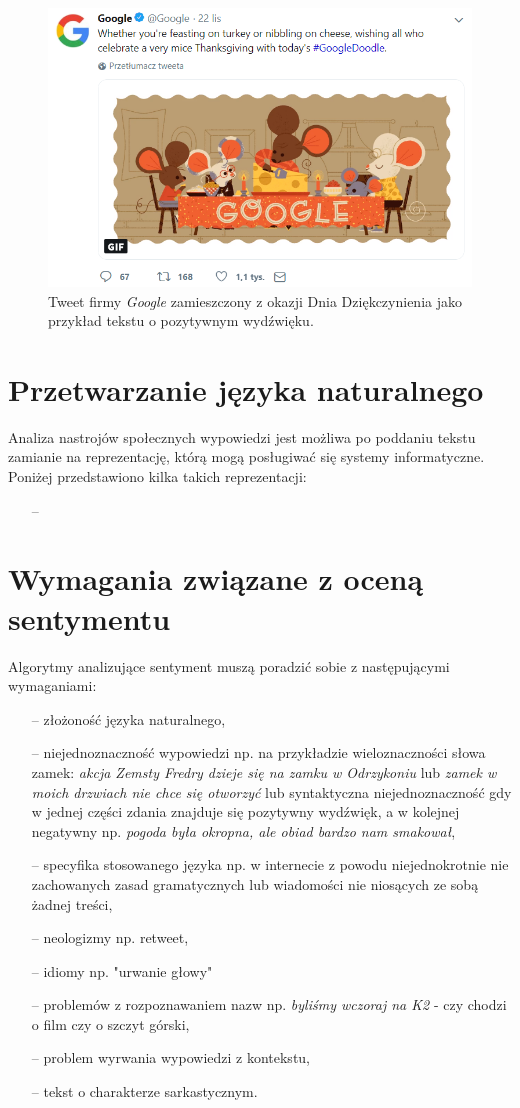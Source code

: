 \begin{figure}[h] %
	\centering
	\includegraphics[width=0.8\linewidth]{img/nlp_google_tweet}
	\caption{Tweet firmy \textit{Google} zamieszczony z okazji Dnia Dziękczynienia jako przykład tekstu o pozytywnym wydźwięku.}
\end{figure}

\section{Przetwarzanie języka naturalnego}
Analiza nastrojów społecznych wypowiedzi jest możliwa po poddaniu tekstu zamianie na reprezentację, którą mogą posługiwać się systemy informatyczne. Poniżej przedstawiono kilka takich reprezentacji:

\begin{itemize}
	\item[--] 
\end{itemize}

\section{Wymagania związane z oceną sentymentu}
Algorytmy analizujące sentyment muszą poradzić sobie z następującymi wymaganiami:

\begin{itemize}
	\item[--] złożoność języka naturalnego,
	\item[--] niejednoznaczność wypowiedzi np. na przykładzie wieloznaczności słowa zamek: \textit{akcja Zemsty Fredry dzieje się na zamku w Odrzykoniu} lub \textit{zamek w moich drzwiach nie chce się otworzyć} lub syntaktyczna niejednoznaczność gdy w jednej części zdania znajduje się pozytywny wydźwięk, a w kolejnej negatywny np. \textit{pogoda była okropna, ale obiad bardzo nam smakował},
	\item[--] specyfika stosowanego języka np. w internecie z powodu niejednokrotnie nie zachowanych zasad gramatycznych lub wiadomości nie niosących ze sobą żadnej treści,
	\item[--] neologizmy np. retweet,
	\item[--] idiomy np. "urwanie głowy"
	\item[--] problemów z rozpoznawaniem nazw np. \textit{byliśmy wczoraj na K2} - czy chodzi o film czy o szczyt górski,
	\item[--] problem wyrwania wypowiedzi z kontekstu,
	\item[--] tekst o charakterze sarkastycznym.
\end{itemize}

